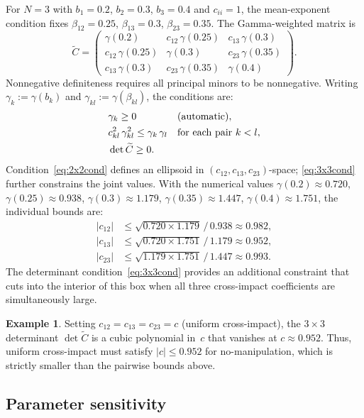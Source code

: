 \documentclass[12pt]{article}
\theoremstyle{definition}
\newtheorem{example}[theorem]{Example}
\theoremstyle{remark}
\newcommand{\bC}{\widetilde{C}}
\begin{document}
For $N=3$ with $b_1=0.2$, $b_2=0.3$, $b_3=0.4$ and $c_{ii}=1$, the
mean-exponent condition fixes $\beta_{12}=0.25$, $\beta_{13}=0.3$, $\beta_{23}=0.35$.
The Gamma-weighted matrix is
\[
  \bC =
  \begin{pmatrix}
    \gamma(0.2) & c_{12}\,\gamma(0.25) & c_{13}\,\gamma(0.3) \\
    c_{12}\,\gamma(0.25) & \gamma(0.3) & c_{23}\,\gamma(0.35) \\
    c_{13}\,\gamma(0.3) & c_{23}\,\gamma(0.35) & \gamma(0.4)
  \end{pmatrix}.
\]
Nonnegative definiteness requires all principal minors to be nonnegative.
Writing $\gamma_k:=\gamma(b_k)$ and $\gamma_{kl}:=\gamma(\beta_{kl})$, the conditions are:
\begin{align}
  & \gamma_k \ge 0 &&\text{(automatic)},\notag\\
  & c_{kl}^2\,\gamma_{kl}^2 \le \gamma_k\,\gamma_l
    &&\text{for each pair $k<l$},\label{eq:2x2cond}\\
  & \det\bC \ge 0.\label{eq:3x3cond}
\end{align}
Condition~\eqref{eq:2x2cond} defines an ellipsoid in $(c_{12},c_{13},c_{23})$-space;
\eqref{eq:3x3cond} further constrains the joint values.  With the numerical values
$\gamma(0.2)\approx 0.720$, $\gamma(0.25)\approx 0.938$, $\gamma(0.3)\approx 1.179$,
$\gamma(0.35)\approx 1.447$, $\gamma(0.4)\approx 1.751$, the individual bounds are:
\begin{align*}
  |c_{12}| &\le \sqrt{0.720\times 1.179}\,/\,0.938 \approx 0.982,\\
  |c_{13}| &\le \sqrt{0.720\times 1.751}\,/\,1.179 \approx 0.952,\\
  |c_{23}| &\le \sqrt{1.179\times 1.751}\,/\,1.447 \approx 0.993.
\end{align*}
The determinant condition~\eqref{eq:3x3cond} provides an additional constraint that cuts
into the interior of this box when all three cross-impact coefficients are simultaneously large.

\begin{example}
Setting $c_{12}=c_{13}=c_{23}=c$ (uniform cross-impact), the $3\times 3$ determinant
$\det\bC$ is a cubic polynomial in~$c$ that vanishes at $c\approx 0.952$.
Thus, uniform cross-impact must satisfy $|c|\le 0.952$ for no-manipulation, which is
strictly smaller than the pairwise bounds above.
\end{example}


\subsection{Parameter sensitivity}\label{sec:sensitivity}
\end{document}
